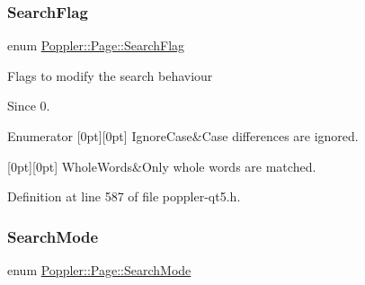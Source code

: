 \subsubsection{\texorpdfstring{Search\+Flag}{SearchFlag}}
{\footnotesize\ttfamily enum \hyperlink{class_poppler_1_1_page_a1e6b7cb8899b951b59d846464474acc1}{Poppler\+::\+Page\+::\+Search\+Flag}}

Flags to modify the search behaviour \begin{DoxySince}{Since}
0. 
\end{DoxySince}
\begin{DoxyEnumFields}{Enumerator}
[0pt][0pt]{}\mbox{\label{class_poppler_1_1_page_a1e6b7cb8899b951b59d846464474acc1a197db93f97ab8ed28d3f72d2da41dea4}} 
Ignore\+Case&Case differences are ignored. \\
\hline

[0pt][0pt]{}\mbox{\label{class_poppler_1_1_page_a1e6b7cb8899b951b59d846464474acc1a3ef9af484677ebc5482494a24ae3ff60}} 
Whole\+Words&Only whole words are matched. \\
\hline

\end{DoxyEnumFields}


Definition at line 587 of file poppler-\/qt5.\+h.

\mbox{\label{class_poppler_1_1_page_ab14d06b2fea7e363fc10877e7f0c759a}} 
\subsubsection{\texorpdfstring{Search\+Mode}{SearchMode}}
{\footnotesize\ttfamily enum \hyperlink{class_poppler_1_1_page_ab14d06b2fea7e363fc10877e7f0c759a}{Poppler\+::\+Page\+::\+Search\+Mode}}

